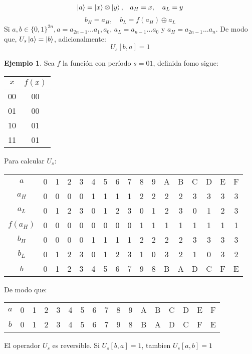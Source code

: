 \documentclass{article}
\theoremstyle{definition}
\newtheorem{ejemplo}{Ejemplo}[section]
\begin{document}

%
%

$$
\begin{aligned}
	\ket{a} = \ket{x}\otimes\ket{y},& \quad a_H = x, \quad a_L = y \\
\end{aligned}
$$
$$ b_H = a_H, \quad b_L = f(a_H) \oplus a_L $$
Si $a,b \in \{0,1\}^{2n}, a = a_{2n-1} \ldots a_1, a_0 $, $a_L = a_{n-1} \ldots 
a_0$ y $a_H = a_{2n-1} \ldots a_n$.
De modo que, $U_s\ket{a} = \ket{b}$, adicionalmente:
$$
	U_s[b, a] = 1
$$

\begin{ejemplo}
Sea $f$ la función con período $s=01$, definida fomo sigue:
\begin{tabular}{|c|c|}
	\hline
	$x$ & $f(x)$ \\\hline
	00 & 00 \\
	01 & 00 \\
	10 & 01 \\
	11 & 01 \\\hline
\end{tabular}

Para calcular $U_s$:

\begin{tabular}{|c|cccc|cccc|cccc|cccc|}
	\hline
	$a$     &0&1&2&3& 4&5&6&7& 8&9&A&B &C&D&E&F \\
	$a_H$   &0&0&0&0& 1&1&1&1& 2&2&2&2 &3&3&3&3 \\
	$a_L$   &0&1&2&3& 0&1&2&3& 0&1&2&3 &0&1&2&3 \\
	$f(a_H)$&0&0&0&0& 0&0&0&0& 1&1&1&1 &1&1&1&1 \\
	$b_H$   &0&0&0&0& 1&1&1&1& 2&2&2&2 &3&3&3&3 \\
	$b_L$   &0&1&2&3& 0&1&2&3& 1&0&3&2 &1&0&3&2 \\
	$b$     &0&1&2&3& 4&5&6&7& 9&8&B&A &D&C&F&E \\
	\hline
\end{tabular}

De modo que:

\begin{tabular}{|c|cccc|cccc|cccc|cccc|}
	\hline
	$a$     &0&1&2&3& 4&5&6&7& 8&9&A&B &C&D&E&F \\
	$b$     &0&1&2&3& 4&5&6&7& 9&8&B&A &D&C&F&E \\
	\hline
\end{tabular}

El operador $U_s$ es reversible.
Si $U_s[b,a] = 1$, tambien $U_s[a,b] = 1$



\end{ejemplo}
\end{document}
